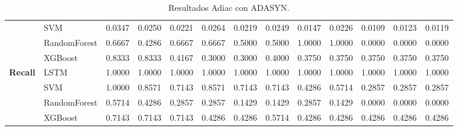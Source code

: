 \begin{table}[h]
\begin{adjustbox}{max width=15cm}
\begin{tabular}{|c|l|r|r|r|r|r|r|r|r|r|r|r|}
			& SVM &  0.0347 &  0.0250 &  0.0221 &  0.0264 &  0.0219 &  0.0249 &  0.0147 &  0.0226 &  0.0109 &  0.0123 &  0.0119 \\
			& RandomForest &  0.6667 &  0.4286 &  0.6667 &  0.6667 &  0.5000 &  0.5000 &  1.0000 &  1.0000 &  0.0000 &  0.0000 &  0.0000 \\
			& XGBoost &  0.8333 &  0.8333 &  0.4167 &  0.3000 &  0.3000 &  0.4000 &  0.3750 &  0.3750 &  0.3750 &  0.3750 &  0.3750 \\
			\hline
			\textbf{Recall} & LSTM &  1.0000 &  1.0000 &  1.0000 &  1.0000 &  1.0000 &  1.0000 &  1.0000 &  1.0000 &  1.0000 &  1.0000 &  1.0000 \\
			& SVM &  1.0000 &  0.8571 &  0.7143 &  0.8571 &  0.7143 &  0.7143 &  0.4286 &  0.5714 &  0.2857 &  0.2857 &  0.2857 \\
			& RandomForest &  0.5714 &  0.4286 &  0.2857 &  0.2857 &  0.1429 &  0.1429 &  0.2857 &  0.1429 &  0.0000 &  0.0000 &  0.0000 \\
			& XGBoost &  0.7143 &  0.7143 &  0.7143 &  0.4286 &  0.4286 &  0.5714 &  0.4286 &  0.4286 &  0.4286 &  0.4286 &  0.4286 \\
			\hline
		\end{tabular}
	\end{adjustbox}
	\caption{Resultados Adiac con ADASYN.}
	\label{tab:Adiac_ADASYN}
\end{table}

